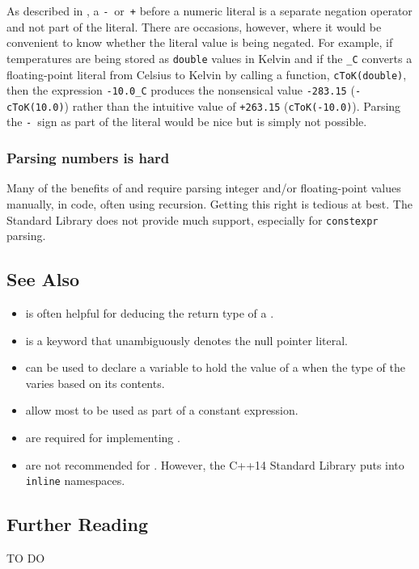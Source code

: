 As described in , a
\lstinline!-!~or~\lstinline!+! before a numeric literal is a separate negation
operator and not part of the literal. There are occasions, however,
where it would be convenient to know whether the literal value is being
negated. For example, if temperatures are being stored as
\lstinline!double! values in Kelvin and if the 
\lstinline!_C! converts a floating-point literal from Celsius to Kelvin by
calling a function, \lstinline!cToK(double)!, then the expression
\lstinline!-10.0_C! produces the nonsensical value \lstinline!-283.15!
(\lstinline!-cToK(10.0)!) rather than the intuitive value of \lstinline!+263.15!
(\lstinline!cToK(-10.0)!). Parsing the
\lstinline!-!~sign as part of the literal would be nice but is simply not possible.

\subsubsection[Parsing numbers is hard]{Parsing numbers is hard}\label{parsing-numbers-is-hard}

Many of the benefits of  and  require parsing integer and/or floating-point values
manually, in code, often using recursion. Getting this right is tedious
at best. The Standard Library does not provide much support, especially
for \lstinline!constexpr! parsing.



\subsection[See Also]{See Also}\label{see-also}

\begin{itemize}
\item{is often helpful for deducing the return type of a .}
\item{is a keyword that unambiguously denotes the null pointer literal.}
\item{ can be used to declare a variable to hold the value of a  when the type of the  varies based on its contents.}
\item{allow most  to be used as part of a constant expression.}
\item{are required for implementing .}
\item{are not recommended for . However, the C++14 Standard Library puts  into \lstinline!inline! namespaces.}
\end{itemize}

\subsection[Further Reading]{Further Reading}\label{further-reading}

TO DO
